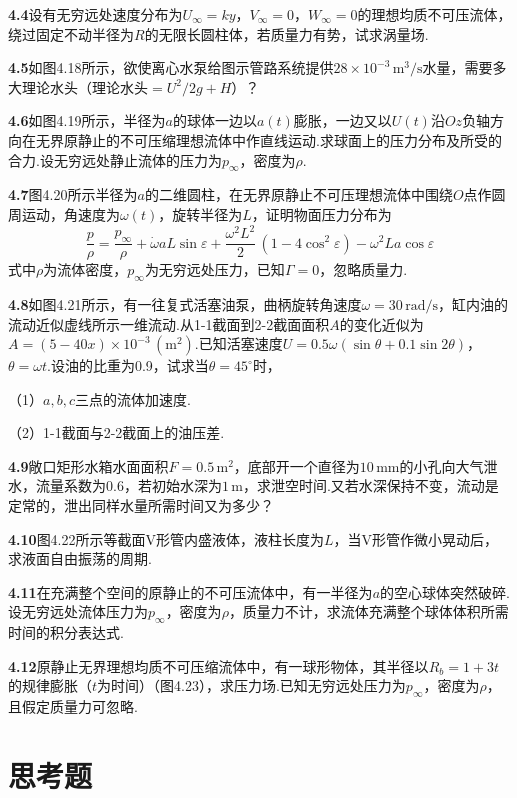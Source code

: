 \noindent\textbf{4.4}\quad 设有无穷远处速度分布为$U_\infty=ky$，$V_\infty=0$，$W_\infty=0$的理想均质不可压流体，绕过固定不动半径为$R$的无限长圆柱体，若质量力有势，试求涡量场.

\noindent\textbf{4.5}\quad 如图4.18所示，欲使离心水泵给图示管路系统提供$28\times10^{-3}\,\mathrm{m^{3}/s}$水量，需要多大理论水头（理论水头$=U^{2}/2g+H$）？

\noindent\textbf{4.6}\quad 如图4.19所示，半径为$a$的球体一边以$a(t)$膨胀，一边又以$U(t)$沿$Oz$负轴方向在无界原静止的不可压缩理想流体中作直线运动.求球面上的压力分布及所受的合力.设无穷远处静止流体的压力为$p_\infty$，密度为$\rho$.

\noindent\textbf{4.7}\quad 图4.20所示半径为$a$的二维圆柱，在无界原静止不可压理想流体中围绕$O$点作圆周运动，角速度为$\omega(t)$，旋转半径为$L$，证明物面压力分布为
\[
\frac{p}{\rho}=\frac{p_\infty}{\rho}+\dot{\omega}aL\sin\varepsilon+\frac{\omega^{2}L^{2}}{2}\,(1-4\cos^{2}\varepsilon)-\omega^{2}La\cos\varepsilon
\]
式中$\rho$为流体密度，$p_\infty$为无穷远处压力，已知$\Gamma=0$，忽略质量力.

\noindent\textbf{4.8}\quad 如图4.21所示，有一往复式活塞油泵，曲柄旋转角速度$\omega=30\,\mathrm{rad/s}$，缸内油的流动近似虚线所示一维流动.从1-1截面到2-2截面面积$A$的变化近似为$A=(5-40x)\times10^{-3}\,(\mathrm{m^{2}})$.已知活塞速度$U=0.5\omega(\sin\theta+0.1\sin 2\theta)$，$\theta=\omega t$.设油的比重为0.9，试求当$\theta=45^{\circ}$时，

（1）$a,b,c$三点的流体加速度.

（2）1-1截面与2-2截面上的油压差.

\noindent\textbf{4.9}\quad 敞口矩形水箱水面面积$F=0.5\,\mathrm{m^{2}}$，底部开一个直径为$10\,\mathrm{mm}$的小孔向大气泄水，流量系数为0.6，若初始水深为$1\,\mathrm{m}$，求泄空时间.又若水深保持不变，流动是定常的，泄出同样水量所需时间又为多少？

\noindent\textbf{4.10}\quad 图4.22所示等截面V形管内盛液体，液柱长度为$L$，当V形管作微小晃动后，求液面自由振荡的周期.

\noindent\textbf{4.11}\quad 在充满整个空间的原静止的不可压流体中，有一半径为$a$的空心球体突然破碎.设无穷远处流体压力为$p_\infty$，密度为$\rho$，质量力不计，求流体充满整个球体体积所需时间的积分表达式.

\noindent\textbf{4.12}\quad 原静止无界理想均质不可压缩流体中，有一球形物体，其半径以$R_b=1+3t$的规律膨胀（$t$为时间）（图4.23），求压力场.已知无穷远处压力为$p_\infty$，密度为$\rho$，且假定质量力可忽略.

\section*{思考题}

